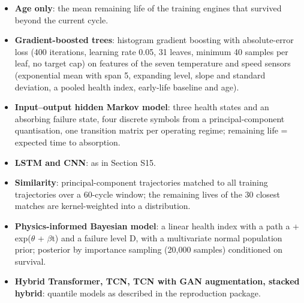 \documentclass[11pt,a4paper]{article}
\begin{document}
\begin{itemize}[leftmargin=1.2em,itemsep=2pt]
\item \textbf{Age only}: the mean remaining life of the training engines that survived beyond the current cycle.
\item \textbf{Gradient-boosted trees}: histogram gradient boosting with absolute-error loss (400 iterations, learning rate 0.05, 31 leaves, minimum 40 samples per leaf, no target cap) on features of the seven temperature and speed sensors (exponential mean with span 5, expanding level, slope and standard deviation, a pooled health index, early-life baseline and age).
\item \textbf{Input--output hidden Markov model}: three health states and an absorbing failure state, four discrete symbols from a principal-component quantisation, one transition matrix per operating regime; remaining life = expected time to absorption.
\item \textbf{LSTM and CNN}: as in Section S15.
\item \textbf{Similarity}: principal-component trajectories matched to all training trajectories over a 60-cycle window; the remaining lives of the 30 closest matches are kernel-weighted into a distribution.
\item \textbf{Physics-informed Bayesian model}: a linear health index with a path a + exp($\theta$ + $\beta$t) and a failure level D, with a multivariate normal population prior; posterior by importance sampling (20,000 samples) conditioned on survival.
\item \textbf{Hybrid Transformer, TCN, TCN with GAN augmentation, stacked hybrid}: quantile models as described in the reproduction package.
\end{itemize}
\end{document}
